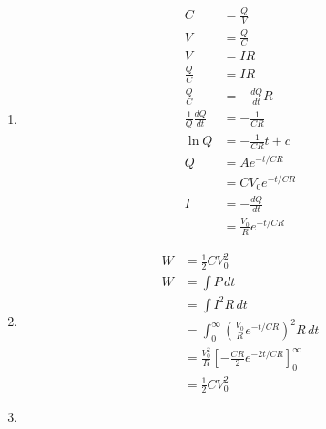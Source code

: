 \documentclass{article}
\begin{document}
\begin{enumerate}
  \item

        \begin{align*}
          C                           & = \frac{Q}{V}                \\
          V                           & = \frac{Q}{C}                \\
          V                           & = I R                        \\
          \frac{Q}{C}                 & = I R                        \\
          \frac{Q}{C}                 & = -\frac{d Q}{d t} R         \\
          \frac{1}{Q} \frac{d Q}{d t} & = -\frac{1}{C R}             \\
          \ln Q                       & = -\frac{1}{C R} t + c       \\
          Q                           & = A e^{-t / C R}             \\
                                      & = C V_0 e^{-t / C R}         \\
          I                           & = -\frac{d Q}{d t}           \\
                                      & = \frac{V_0}{R} e^{-t / C R}
        \end{align*}

  \item

        \begin{align*}
          W & = \frac{1}{2} C V_0^2                                                   \\
          W & = \int P \,d t                                                          \\
            & = \int I^2 R \,d t                                                      \\
            & = \int_0^\infty \left( \frac{V_0}{R} e^{-t / C R} \right)^2 R \,d t     \\
            & = \frac{V_0^2}{R} \left[ -\frac{C R}{2} e^{-2 t / C R} \right]_0^\infty \\
            & = \frac{1}{2} C V_0^2
        \end{align*}

  \item


\end{enumerate}
\end{document}
